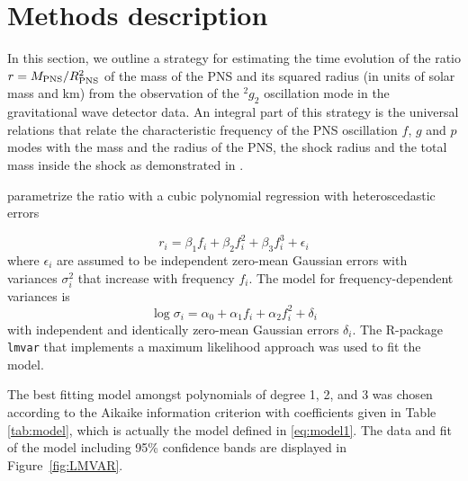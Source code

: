 \section{Methods description}
\label{methods}

In this section, we outline a strategy for estimating the time evolution of the
ratio $r=M_{\rm PNS}/R_{\rm PNS}^2$ of the mass of the PNS and its squared radius
(in units of solar mass and km) from the observation of the $\mbox{}^2g_2$
oscillation mode in the gravitational wave detector data.
An integral part of this strategy is the universal relations that relate the
characteristic frequency of the PNS oscillation $f$, $g$ and $p$ modes with the mass
and the radius of the PNS, the shock radius and the total mass inside the shock as
demonstrated in \cite{Torres:2019b}.

 parametrize the ratio with a cubic polynomial
regression with heteroscedastic errors

\begin{equation}
\label{eq:model1}
r_i=\beta_1 f_i + \beta_2 f_i^2 +\beta_3 f_i^3 + \epsilon_i
\end{equation}
where $\epsilon_i$ are assumed to be independent zero-mean Gaussian errors with
variances $\sigma_i^2$ that increase with frequency $f_i$. The model for frequency-dependent
variances is
\begin{equation}
\log \sigma_i=\alpha_0+ \alpha_1 f_i + \alpha_2 f_i^2 + \delta_i
\end{equation}
with independent and identically zero-mean Gaussian errors $\delta_i$. The R-package \texttt{lmvar}
\cite{lmvar:2019} that implements a maximum likelihood approach was used to fit the model.

The best fitting model amongst polynomials of degree 1, 2, and 3  was chosen according to
the Aikaike information criterion with coefficients given in Table \ref{tab:model}, which is actually the model defined in \eqref{eq:model1}.  The data and fit of the model including 95\% confidence bands are displayed in
Figure~\ref{fig:LMVAR}.

